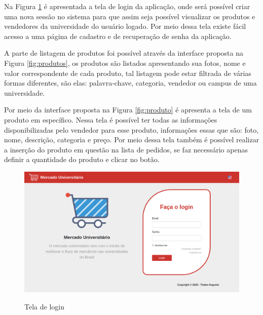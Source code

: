 
Na Figura \ref{fig:login} é apresentada a tela de login da aplicação, onde será possível criar uma nova sessão no sistema para que assim seja possível visualizar os produtos e vendedores da universidade do usuário logado. Por meio dessa tela existe fácil acesso a uma página de cadastro e de recuperação de senha da aplicação.

A parte de listagem de produtos foi possível através da interface proposta na Figura \ref{fig:produtos}, os produtos são listados apresentando sua fotos, nome e valor correspondente de cada produto, tal listagem pode estar filtrada de várias formas diferentes, são elas: palavra-chave, categoria, vendedor ou campus de uma universidade.

Por meio da interface proposta na Figura \ref{fig:produto} é apresenta a tela de um produto em específico. Nessa tela é possível ter todas as informações disponibilizadas pelo vendedor para esse produto, informações essas que são: foto, nome, descrição, categoria e preço. Por meio dessa tela também é possível realizar a inserção do produto em questão na lista de pedidos, se faz necessário apenas definir a quantidade do produto e clicar no botão.

\begin{figure}[htbp!]
  \centering
  \caption{Tela de login}
  \includegraphics[width=1\textwidth]{figs/resultado/login.png}
    \label{fig:login}
\end{figure}

